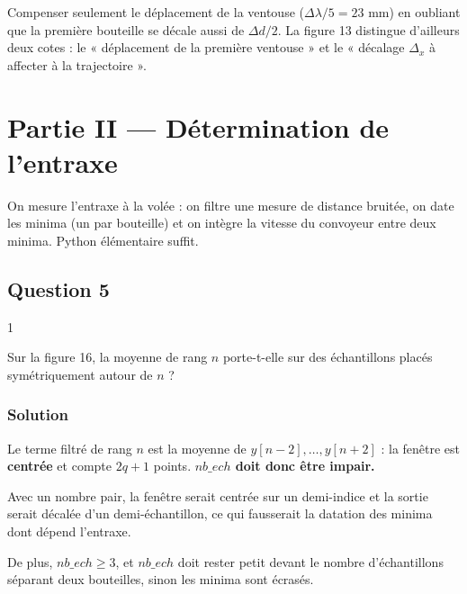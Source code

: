 \documentclass[11pt,a4paper]{article}
\begin{document}
\begin{piege}

Compenser seulement le déplacement de la ventouse (\(\Delta\lambda/5=23\) mm) en oubliant que la première bouteille se décale aussi de \(\Delta d/2\). La figure 13 distingue d'ailleurs deux cotes : le « déplacement de la première ventouse » et le « décalage \(\Delta_x\) à affecter à la trajectoire ».

\end{piege}

\hypertarget{partie-ii-duxe9termination-de-lentraxe}{%
\section{Partie II --- Détermination de l'entraxe}\label{partie-ii-duxe9termination-de-lentraxe}}

On mesure l'entraxe à la volée : on filtre une mesure de distance bruitée, on date les minima (un par bouteille) et on intègre la vitesse du convoyeur entre deux minima. Python élémentaire suffit.

\hypertarget{question-5}{%
\subsection{Question 5}\label{question-5}}

\begin{indication}{1}

Sur la figure 16, la moyenne de rang \(n\) porte-t-elle sur des échantillons placés symétriquement autour de \(n\) ?

\end{indication}

\hypertarget{solution-4}{%
\subsubsection{Solution}\label{solution-4}}

Le terme filtré de rang \(n\) est la moyenne de \(y[n-2],\dots,y[n+2]\) : la fenêtre est \textbf{centrée} et compte \(2q+1\) points. \textbf{\(nb\_ech\) doit donc être impair.}

Avec un nombre pair, la fenêtre serait centrée sur un demi-indice et la sortie serait décalée d'un demi-échantillon, ce qui fausserait la datation des minima dont dépend l'entraxe.

De plus, \(nb\_ech\ge3\), et \(nb\_ech\) doit rester petit devant le nombre d'échantillons séparant deux bouteilles, sinon les minima sont écrasés.
\end{document}
